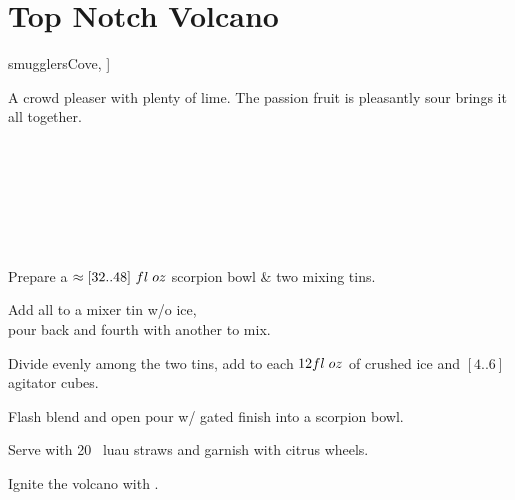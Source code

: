 \section[Top Notch Volcano]{Top Notch Volcano~}

\begin{recipestats}[
        servings=4,
        preptime=10~\minute,
        original=\citeauthor{smugglersCove}~\cite[p.~134]{smugglersCove},
    ]
\end{recipestats}

\begin{recipeabstract}
    A crowd pleaser with plenty of lime.
    The passion fruit is pleasantly sour brings it all together.
\end{recipeabstract}

\begin{ingredientcolumns}
    \begin{ingredientblock}
        \\
        \\
        \\
    \end{ingredientblock}

    \begin{ingredientblock}
        \\
        \\
    \end{ingredientblock}
\end{ingredientcolumns}

\begin{preparation}
\item Prepare a $\approx[32..48]~fl\;oz$ scorpion bowl \& two mixing tins.
\item Add all to a mixer tin w/o ice,\\
    pour back and fourth with another to mix.
\item Divide evenly among the two tins, add to each $12fl\;oz$ of crushed ice
    and $[4..6]$ agitator cubes.
\item Flash blend and open pour w/ gated finish into a scorpion bowl.
\item Serve with 20 \inch~luau straws and garnish with citrus wheels.
\item Ignite the volcano with .
\end{preparation}

\recipeend%
